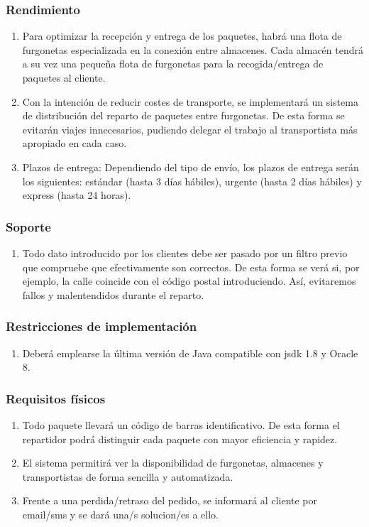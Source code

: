 \subsubsection{Rendimiento}
\begin{enumerate}
	\item Para optimizar la recepción y entrega de los paquetes, habrá una flota de furgonetas especializada en la conexión entre almacenes. Cada almacén tendrá a su vez una pequeña flota de furgonetas para la recogida/entrega de paquetes al cliente.
	\item Con la intención de reducir costes de transporte, se implementará un sistema de distribución del reparto de paquetes entre furgonetas. De esta forma se evitarán viajes innecesarios, pudiendo delegar el trabajo al transportista más apropiado en cada caso.
	\item Plazos de entrega: Dependiendo del tipo de envío, los plazos de entrega serán los siguientes: estándar (hasta 3 días hábiles), urgente (hasta 2 días hábiles) y express (hasta 24 horas).
\end{enumerate}

\subsubsection{Soporte}
\begin{enumerate}
	\item Todo dato introducido por los clientes debe ser pasado por un filtro previo que compruebe que efectivamente son correctos. De esta forma se verá si, por ejemplo, la calle coincide con el código postal introduciendo. Así, evitaremos fallos y malentendidos durante el reparto.
\end{enumerate}
	
\subsubsection{Restricciones de implementación}
\begin{enumerate}
	\item Deberá emplearse la última versión de Java compatible con jsdk 1.8 y Oracle 8.
\end{enumerate}
\subsubsection{Requisitos físicos}
\begin{enumerate}
	\item Todo paquete llevará un código de barras identificativo. De esta forma el repartidor podrá distinguir cada paquete con mayor eficiencia y rapidez.
    \item El sistema permitirá ver la disponibilidad  de furgonetas, almacenes y transportistas de forma sencilla y automatizada.
    \item Frente a una perdida/retraso del pedido, se informará al cliente por email/sms y se dará una/s solucion/es a ello.
    \end{enumerate}


